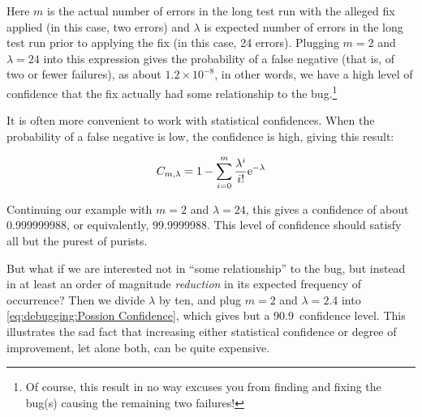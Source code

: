 Here $m$ is the actual number of errors in the long test run with the
alleged fix applied (in this case, two errors) and $\lambda$ is expected
number of errors in the long test run prior to applying the fix (in this
case, 24 errors).
Plugging $m=2$ and $\lambda=24$ into this expression gives the probability
of a false negative (that is, of two or fewer failures), as about
$1.2 \times 10^{-8}$, in other words, we have a high level of confidence
that the fix actually had some relationship to the bug.\footnote{
	Of course, this result in no way excuses you from finding and
	fixing the bug(s) causing the remaining two failures!}

It is often more convenient to work with statistical confidences.
When the probability of a false negative is low, the confidence is high,
giving this result:

\begin{equation}
	C_{m,\lambda} = 1 - \sum_{i=0}^m \frac{\lambda^i}{i!} \mathrm{e}^{-\lambda}
\label{eq:debugging:Possion Confidence}
\end{equation}

Continuing our example with $m=2$ and $\lambda=24$, this gives a confidence
of about 0.999999988, or equivalently, 99.9999988\pct.
This level of confidence should satisfy all but the purest of purists.

But what if we are interested not in ``some relationship'' to the bug,
but instead in at least an order of magnitude \emph{reduction} in its
expected frequency of occurrence?
Then we divide $\lambda$ by ten, and plug $m=2$ and $\lambda=2.4$ into
\cref{eq:debugging:Possion Confidence},
which gives but a 90.9\pct\ confidence level.
This illustrates the sad fact that increasing either statistical
confidence or degree of improvement, let alone both, can be quite
expensive.

